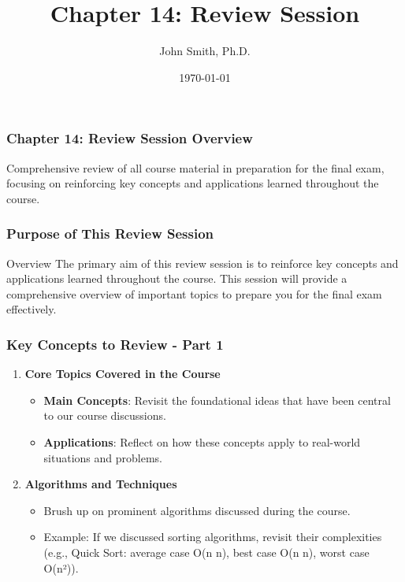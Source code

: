 \documentclass[aspectratio=169]{beamer}
\title[Chapter 14: Review Session]{Chapter 14: Review Session}
\author[J. Smith]{John Smith, Ph.D.}
\institute[University Name]{
  Department of Computer Science\\
  University Name\\
  \vspace{0.3cm}
  Email: email@university.edu\\
  Website: www.university.edu
}
\date{\today}
\begin{document}
\frame{\titlepage}

\begin{frame}[fragile]
    \frametitle{Chapter 14: Review Session Overview}
    Comprehensive review of all course material in preparation for the final exam, focusing on reinforcing key concepts and applications learned throughout the course.
\end{frame}

\begin{frame}[fragile]
    \frametitle{Purpose of This Review Session}
    \begin{block}{Overview}
        The primary aim of this review session is to reinforce key concepts and applications learned throughout the course. This session will provide a comprehensive overview of important topics to prepare you for the final exam effectively.
    \end{block}
\end{frame}

\begin{frame}[fragile]
    \frametitle{Key Concepts to Review - Part 1}
    \begin{enumerate}
        \item \textbf{Core Topics Covered in the Course}
        \begin{itemize}
            \item \textbf{Main Concepts}: Revisit the foundational ideas that have been central to our course discussions.
            \item \textbf{Applications}: Reflect on how these concepts apply to real-world situations and problems.
        \end{itemize}

        \item \textbf{Algorithms and Techniques}
        \begin{itemize}
            \item Brush up on prominent algorithms discussed during the course. 
            \item Example: If we discussed sorting algorithms, revisit their complexities (e.g., Quick Sort: average case O(n \log n), best case O(n \log n), worst case O(n²)).
        \end{itemize}
    \end{enumerate}
\end{frame}
\end{document}
